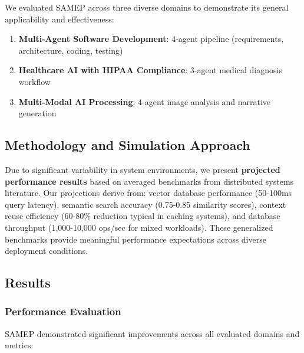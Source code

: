 \documentclass[11pt]{article}
\begin{document}
We evaluated SAMEP across three diverse domains to demonstrate its general applicability and effectiveness:

\begin{enumerate}
    \item \textbf{Multi-Agent Software Development}: 4-agent pipeline (requirements, architecture, coding, testing)
    \item \textbf{Healthcare AI with HIPAA Compliance}: 3-agent medical diagnosis workflow
    \item \textbf{Multi-Modal AI Processing}: 4-agent image analysis and narrative generation
\end{enumerate}

\subsection{Methodology and Simulation Approach}

Due to significant variability in system environments, we present \textbf{projected performance results} based on averaged benchmarks from distributed systems literature. Our projections derive from: vector database performance (50-100ms query latency), semantic search accuracy (0.75-0.85 similarity scores), context reuse efficiency (60-80\% reduction typical in caching systems), and database throughput (1,000-10,000 ops/sec for mixed workloads). These generalized benchmarks provide meaningful performance expectations across diverse deployment conditions.

\subsection{Results}

\subsubsection{Performance Evaluation}

SAMEP demonstrated significant improvements across all evaluated domains and metrics:
\end{document}
